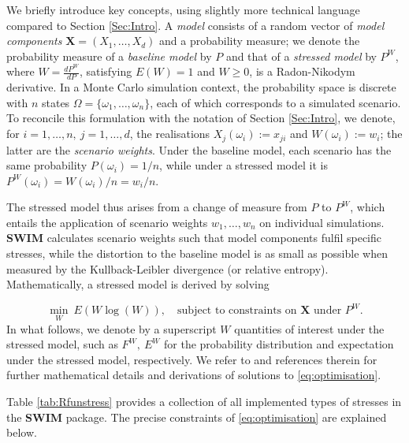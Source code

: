 \documentclass[
]{article}
\begin{document}
We briefly introduce key concepts, using slightly more technical language compared to Section \ref{Sec:Intro}. A \emph{model} consists of a random vector of \emph{model components} \(\mathbf X = (X_1,\dots,X_d)\) and a probability measure; we denote the probability measure of a \emph{baseline model} by \(P\) and that of a \emph{stressed model} by \(P^W\), where \(W= \frac{dP^W}{dP}\), satisfying \(E(W)=1\) and \(W\geq 0\), is a Radon-Nikodym derivative. In a Monte Carlo simulation context, the probability space is discrete with \(n\) states \(\Omega=\{\omega_1,\dots,\omega_n\}\), each of which corresponds to a simulated scenario. To reconcile this formulation with the notation of Section \ref{Sec:Intro}, we denote, for \(i=1, \dots, n,~j=1,\dots, d\), the realisations \(X_j(\omega_i):= x_{ji}\) and \(W(\omega_i):=w_i\); the latter are the \emph{scenario weights}. Under the baseline model, each scenario has the same probability \(P(\omega_i)=1/n\), while under a stressed model it is \(P^W(\omega_i)=W(\omega_i)/n=w_i/n\).

The stressed model thus arises from a change of measure from \(P\) to \(P^W\), which entails the application of scenario weights \(w_1,\dots, w_n\) on individual simulations. \textbf{SWIM} calculates scenario weights such that model components fulfil specific stresses, while the distortion to the baseline model is as small as possible when measured by the Kullback-Leibler divergence (or relative entropy). Mathematically, a stressed model is derived by solving

\begin{equation} 
\min_{ W } ~E(W \log (W)), \quad
\text{subject to constraints on } \mathbf X \text{ under } P^W.
\label{eq:optimisation}
\end{equation}
In what follows, we denote by a superscript \(W\) quantities of interest under the stressed model, such as \(F^W, ~ E^W\) for the probability distribution and expectation under the stressed model, respectively. We refer to \citet{Pesenti2019} and references therein for further mathematical details and derivations of solutions to \eqref{eq:optimisation}.

Table \ref{tab:Rfunstress} provides a collection of all implemented types of stresses in the \textbf{SWIM} package. The precise constraints of \eqref{eq:optimisation} are explained below.
\end{document}
